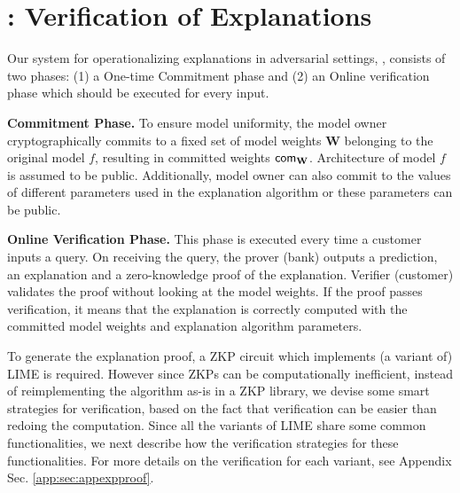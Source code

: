 \section{\name : Verification of Explanations}\label{sec:verifylime}


Our system for operationalizing explanations in adversarial settings, \name, consists of two phases: (1) a One-time Commitment phase and (2) an Online verification phase which should be executed for every input.

\textbf{Commitment Phase.} To ensure model uniformity, the model owner cryptographically commits to a fixed set of model weights $\mathbf{W}$ belonging to the original model $f$, resulting in committed weights $\textsf{com}_{\mathbf{W}}$. Architecture of model $f$ is assumed to be public. Additionally, model owner can also commit to the values of different parameters used in the explanation algorithm or these parameters can be public.%



\textbf{Online Verification Phase.} This phase is executed every time a customer inputs a query. On receiving the query, the prover (bank) outputs a prediction, an explanation and a zero-knowledge proof of the explanation. Verifier (customer) validates the proof without looking at the model weights. If the proof passes verification, it means that the explanation is correctly computed with the committed model weights and explanation algorithm parameters.

To generate the explanation proof, a ZKP circuit which implements (a variant of) LIME is required. However since ZKPs can be computationally inefficient, instead of reimplementing the algorithm as-is in a ZKP library, we devise some smart strategies for verification, based on the fact that verification can be easier than redoing the computation. Since all the variants of LIME share some common functionalities, we next describe how the verification strategies for these functionalities. For more details on the verification for each variant, see Appendix Sec. \ref{app:sec:appexpproof}.

